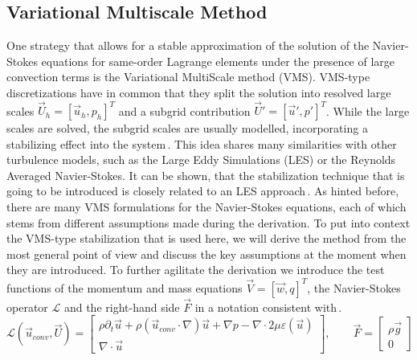 \subsection{Variational Multiscale Method}
One strategy that allows for a stable approximation of the solution of the Navier-Stokes equations for same-order Lagrange elements under the presence of large convection terms is the Variational MultiScale method (VMS). VMS-type discretizations have in common that they split the solution into resolved large scales $\vec{U}_h = {[\vec{u}_h, p_h]}^T$ and a subgrid contribution $\vec{U}'= {[\vec{u}', p']}^T$. While the large scales are solved, the subgrid scales are usually modelled, incorporating a stabilizing effect into the system\,\cite{Codina2002, Hughes2017}. This idea shares many similarities with other turbulence models, such as the Large Eddy Simulations (LES) or the Reynolds Averaged Navier-Stokes. It can be shown, that the stabilization technique that is going to be introduced is closely related to an LES approach\,\cite{Hughes2017}. As hinted before, there are many VMS formulations for the Navier-Stokes equations, each of which stems from different assumptions made during the derivation. To put into context the VMS-type stabilization that is used here, we will derive the method from the most general point of view and discuss the key assumptions at the moment when they are introduced. To further agilitate the derivation we introduce the test functions of the momentum and mass equations $\vec{V} = {[\vec{w}, q]}^T$, the Navier-Stokes operator $\mathcal{L}$ and the right-hand side $\vec{F}$ in a notation consistent with\,\cite{Codina2002}.
\begin{equation*}
	\mathcal{L}(\vec{u}_{conv}, \vec{U}) = \begin{bmatrix}
		\rho\partial_t \vec{u} + \rho(\vec{u}_{conv}\cdot\nabla)\vec{u} + \nabla p - \nabla\cdot2\mu\varepsilon(\vec{u}) \\
		\nabla \cdot \vec{u}
	\end{bmatrix}, \qquad
	\vec{F} = \begin{bmatrix}
		\rho\vec{g} \\
		0
	\end{bmatrix}
\end{equation*}


